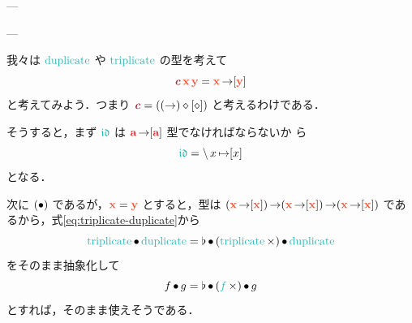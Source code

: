 \documentclass[a5paper,twoside,fleqn,draft]{jsbook}
\begin{document}
---

---

我々は $\mDuplicate$ や $\mTriplicate$ の型を考えて
\begin{equation}
  \mTypeConstructor{c}\,\mX\,\mY
  =\mX\hFunctionArrow[\mY]
\end{equation}
と考えてみよう．つまり
$\mTypeConstructor{c}=((\hFunctionArrow)\hAnonParam[\hAnonParam])$
と考えるわけである．

そうすると，まず $\mIdCat$ は $\hTypeName{a}\hFunctionArrow\hListConstruct{\hTypeName{a}}$ 型でなければならないか
ら
\begin{equation}
  \label{eq:id-category}
  \mIdCat
  =\mLambda x\mLambdaArrow[x]
\end{equation}
となる．

次に $(\operatorname{\bullet})$ であるが，$\mX=\mY$ とすると，型は
$(\mX\hFunctionArrow[\mX])\hFunctionArrow(\mX\hFunctionArrow[\mX])\hFunctionArrow(\mX\hFunctionArrow[\mX])$
であるから，式\eqref{eq:triplicate-duplicate}から
\begin{equation}
  \mTriplicate\mCompCat\mDuplicate
  =\mJoinList\hCompose{}(\mTriplicate\hMap)\hCompose\mDuplicate
\end{equation}
をそのまま抽象化して
\begin{equation}
  \label{eq:triplicate-duplicate-comp}
  f\mCompCat g=\mJoinList\hCompose{}(\hFunc{f}\hMap)\hCompose g
\end{equation}
とすれば，そのまま使えそうである．
\end{document}
